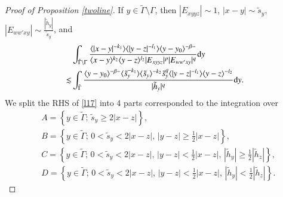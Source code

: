 \documentclass[11pt,reqno]{amsart}
\def\d{{\rm d}}
\numberwithin{equation}{section}
\theoremstyle{definition}
\begin{document}
\begin{appendix}
\begin{proof}[Proof of Proposition \ref{twoline}]
		If $y\in\tilde{\Gamma}\setminus\Gamma$, then $|E_{xyyz}|\sim1$, $|x-y|\sim\tilde{s}_y$, $|E_{ww'xy}|\sim\frac{|\tilde{h}_y|}{\tilde{s}_y}$, and
		\begin{equation}\label{l17}
			\begin{split}
				&\int_{\tilde{\Gamma}\setminus\Gamma}\frac{\langle|x-y|^{-k_1}\rangle\langle|y-z|^{-l_1}\rangle\langle y-y_0\rangle^{-\beta-}}{\langle x-y\rangle^{k_2}\langle y-z\rangle^{l_2}|E_{xyyz}|^p|E_{ww'xy}|^q}\d y\\
				\lesssim&\int_{\tilde{\Gamma}}\frac{\langle y-y_0\rangle^{-\beta-}\langle\tilde{s}_y^{-k_1}\rangle\langle\tilde{s}_y\rangle^{-k_2}\tilde{s}_y^q\langle|y-z|^{-l_1}\rangle\langle y-z\rangle^{-l_2}}{|\tilde{h}_y|^q}\d y.
			\end{split}
		\end{equation}
		We split the RHS of \eqref{l17} into 4 parts corresponded to the integration over
		\begin{equation*}
			\begin{split}
				&A=\left\{y\in\tilde{\Gamma};\,\tilde{s}_y\geq2|x-z|\right\},\\
				&B=\left\{y\in\tilde{\Gamma};\,0<\tilde{s}_y<2|x-z|,\,\mbox{$|y-z|\geq\frac12|x-z|$}\right\},\\
				&C=\left\{y\in\tilde{\Gamma};\,0<\tilde{s}_y<2|x-z|,\,\mbox{$|y-z|<\frac12|x-z|$},\,\mbox{$|\tilde{h}_y|\geq\frac12|\tilde{h}_z|$}\right\},\\
				&D=\left\{y\in\tilde{\Gamma};\,0<\tilde{s}_y<2|x-z|,\,\mbox{$|y-z|<\frac12|x-z|$},\,\mbox{$|\tilde{h}_y|<\frac12|\tilde{h}_z|$}\right\}.
			\end{split}
		\end{equation*}
		

\end{proof}
\end{appendix}
\end{document}
